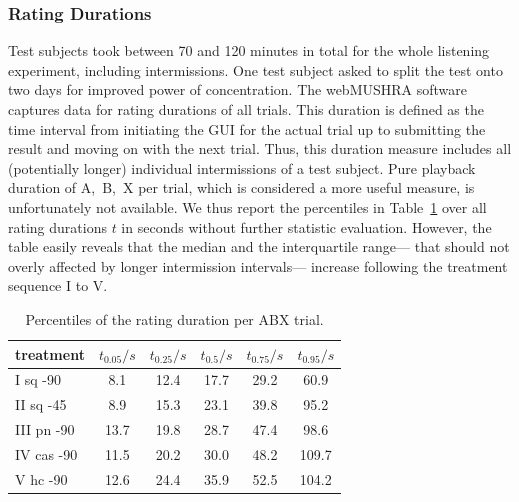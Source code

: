 \subsubsection{Rating Durations}
Test subjects took between 70 and 120 minutes in total for the whole listening
experiment, including intermissions.
%
One test subject asked to split the test onto two days for improved power of
concentration.
%
\NewL The webMUSHRA software captures data for rating durations of all trials.
%
This duration is defined as the time interval from initiating the GUI for the
actual trial up to submitting the result and moving on with the next trial.
%
Thus, this duration measure includes all (potentially longer) individual
intermissions of a test subject.
%
Pure playback duration of A,~B,~X per trial,
which is considered a more useful measure, is unfortunately not available.
%
We thus report the percentiles in Table~\ref{tbl:duration} over all rating
durations $t$ in seconds without further statistic evaluation.
%
However, the table easily reveals that the median and the interquartile range---%
that should not overly affected by longer intermission intervals---%
increase following the treatment sequence I to V.
%
\begin{table}[h]
\centering
  \begin{tabular}{ l | c | c | c | c | c}
    treatment &  $t_{0.05} / s$ & $t_{0.25} / s$ & $t_{0.5} / s$ & $t_{0.75}/s$ & $t_{0.95}/s$\\ \hline
    I sq -90 &8.1& 12.4& 17.7& 29.2& 60.9\\ \hline
    II sq -45 &8.9& 15.3& 23.1& 39.8& 95.2\\ \hline
    III pn -90 &13.7& 19.8& 28.7& 47.4& 98.6\\ \hline
    IV cas -90 &11.5 &20.2 &30.0 &48.2 &109.7\\ \hline
    V hc -90 &12.6  &24.4 &35.9 &52.5 &104.2\\ \hline
  \end{tabular}
\caption{Percentiles of the rating duration per ABX trial.}
\label{tbl:duration}
\end{table}


